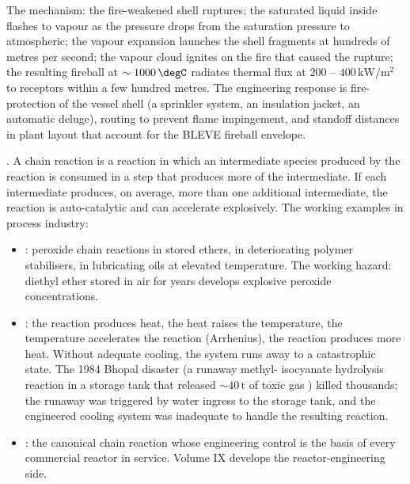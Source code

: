 The mechanism: the fire-weakened shell ruptures; the saturated liquid
inside flashes to vapour as the pressure drops from the saturation
pressure to atmospheric; the vapour expansion launches the shell
fragments at hundreds of metres per second; the vapour cloud ignites
on the fire that caused the rupture; the resulting fireball at $\sim
1000\,\degC$ radiates thermal flux at $200$ -- $400\,\text{kW}/\text{m}^2$
to receptors within a few hundred metres. The engineering response is
fire-protection of the vessel shell (a sprinkler system, an insulation
jacket, an automatic deluge), routing to prevent flame impingement,
and standoff distances in plant layout that account for the BLEVE
fireball envelope.

. A chain reaction is
a reaction in which an intermediate species produced by the reaction
is consumed in a step that produces more of the intermediate. If each
intermediate produces, on average, more than one additional
intermediate, the reaction is auto-catalytic and can accelerate
explosively. The working examples in process industry:

\begin{itemize}[leftmargin=*]
\item {}: peroxide chain
  reactions in stored ethers, in deteriorating polymer stabilisers,
  in lubricating oils at elevated temperature. The working hazard:
  diethyl ether stored in air for years develops explosive peroxide
  concentrations.
\item {}: the reaction
  produces heat, the heat raises the temperature, the temperature
  accelerates the reaction (Arrhenius), the reaction produces more
  heat. Without adequate cooling, the system runs away to a
  catastrophic state. The 1984 Bhopal disaster (a runaway methyl-
  isocyanate hydrolysis reaction in a storage tank that released
  $\sim 40\,\text{t}$ of toxic gas \cite{acc:icmr-bhopal-2004})
  killed thousands; the runaway was triggered by water ingress to
  the storage tank, and the engineered cooling system was inadequate
  to handle the resulting reaction.
\item {}: the canonical chain reaction
  whose engineering control is the basis of every commercial reactor
  in service. Volume IX develops the reactor-engineering side.
\end{itemize}

